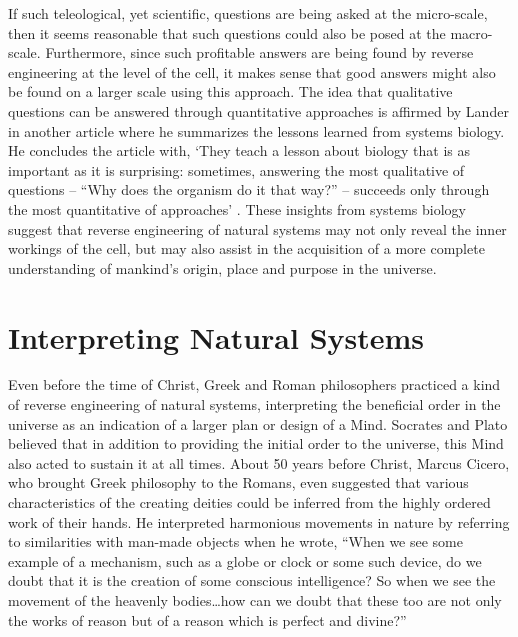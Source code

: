 If such teleological, yet scientific, questions are being asked at the
micro-scale, then it seems reasonable that such questions could also be
posed at the macro-scale. Furthermore, since such profitable answers
are being found by reverse engineering at the level of the cell, it
makes sense that good answers might also be found on a larger scale
using this approach. The idea that qualitative questions can be
answered through quantitative approaches is affirmed by Lander in
another article where he summarizes the lessons learned from systems
biology. He concludes the article with, `They teach a lesson about
biology that is as important as it is surprising: sometimes, answering
the most qualitative of questions – ``Why does the organism do it that
way?'' – succeeds only through the most quantitative of
approaches' \citep{lander2007}. These insights from systems biology
suggest that reverse engineering of natural systems may not only reveal
the inner workings of the cell, but may also assist in the acquisition
of a more complete understanding of mankind’s origin, place and purpose
in the universe.

\section{Interpreting Natural Systems}

Even before the time of Christ, Greek and Roman philosophers practiced a
kind of reverse engineering of natural systems, interpreting the
beneficial order in the universe as an indication of a larger plan or
design of a Mind.\citep{sedley2009} Socrates and Plato believed that
in addition to providing the initial order to the universe, this Mind
also acted to sustain it at all times. About 50 years before Christ,
Marcus Cicero, who brought Greek philosophy to the Romans, even
suggested that various characteristics of the creating deities could be
inferred from the highly ordered work of their hands. He interpreted
harmonious movements in nature by referring to similarities with
man-made objects when he wrote, “When we see some example of a
mechanism, such as a globe or clock or some such device, do we doubt
that it is the creation of some conscious intelligence? So when we see
the movement of the heavenly bodies…how can we doubt that these too are
not only the works of reason but of a reason which is perfect and
divine?”\citep[][pg. 89]{ciceronature}

